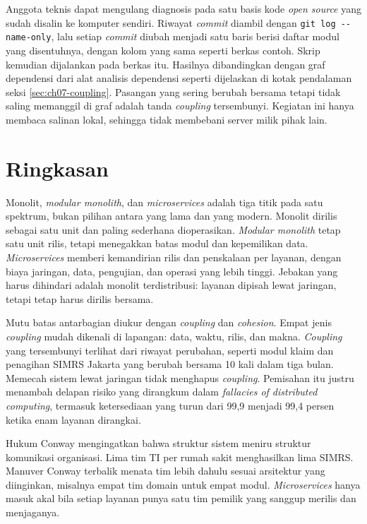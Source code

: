 \begin{pendalaman}[title={Pendalaman Teknis (opsional): Coupling pada Basis Kode Open Source}]
  Anggota teknis dapat mengulang diagnosis pada satu basis kode \textit{open source} yang sudah
  disalin ke komputer sendiri. Riwayat \textit{commit} diambil dengan \texttt{git log
  -{}-name-only}, lalu setiap \textit{commit} diubah menjadi satu baris berisi daftar modul yang
  disentuhnya, dengan kolom yang sama seperti berkas contoh. Skrip
   kemudian dijalankan pada berkas itu. Hasilnya
  dibandingkan dengan graf dependensi dari alat analisis dependensi seperti dijelaskan di kotak
  pendalaman seksi \ref{sec:ch07-coupling}. Pasangan yang sering berubah bersama tetapi tidak
  saling memanggil di graf adalah tanda \textit{coupling} tersembunyi. Kegiatan ini hanya membaca
  salinan lokal, sehingga tidak membebani server milik pihak lain.
\end{pendalaman}

\section{Ringkasan}

Monolit, \textit{modular monolith}, dan \textit{microservices} adalah tiga titik pada satu
spektrum, bukan pilihan antara yang lama dan yang modern. Monolit dirilis sebagai satu unit dan
paling sederhana dioperasikan. \textit{Modular monolith} tetap satu unit rilis, tetapi menegakkan
batas modul dan kepemilikan data. \textit{Microservices} memberi kemandirian rilis dan penskalaan
per layanan, dengan biaya jaringan, data, pengujian, dan operasi yang lebih tinggi. Jebakan yang
harus dihindari adalah monolit terdistribusi: layanan dipisah lewat jaringan, tetapi tetap harus
dirilis bersama.

Mutu batas antarbagian diukur dengan \textit{coupling} dan \textit{cohesion}. Empat jenis
\textit{coupling} mudah dikenali di lapangan: data, waktu, rilis, dan makna. \textit{Coupling} yang
tersembunyi terlihat dari riwayat perubahan, seperti modul klaim dan penagihan SIMRS Jakarta yang
berubah bersama 10 kali dalam tiga bulan. Memecah sistem lewat jaringan tidak menghapus
\textit{coupling}. Pemisahan itu justru menambah delapan risiko yang dirangkum dalam
\textit{fallacies of distributed computing}, termasuk ketersediaan yang turun dari 99,9 menjadi
99,4 persen ketika enam layanan dirangkai.

Hukum Conway mengingatkan bahwa struktur sistem meniru struktur komunikasi organisasi. Lima tim TI
per rumah sakit menghasilkan lima SIMRS. Manuver Conway terbalik menata tim lebih dahulu sesuai
arsitektur yang diinginkan, misalnya empat tim domain untuk empat modul. \textit{Microservices} hanya
masuk akal bila setiap layanan punya satu tim pemilik yang sanggup merilis dan menjaganya.

